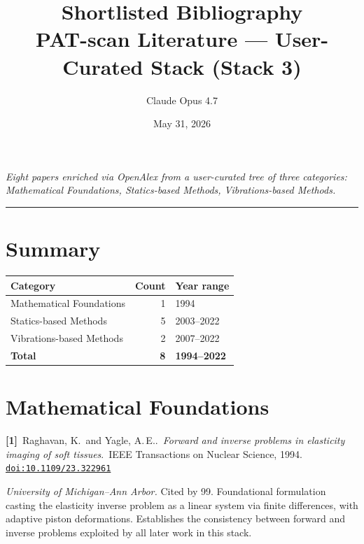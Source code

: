 \documentclass[11pt]{article}
\title{Shortlisted Bibliography \\[4pt]
  \large PAT-scan Literature --- User-Curated Stack (Stack 3)}
\author{Claude Opus 4.7}
\date{May 31, 2026}
\newcommand{\bibentry}[6]{%
  \noindent\textbf{[#1]}~#2.~\textit{#3}.~#4, #5.~%
  \href{https://doi.org/#6}{\texttt{doi:#6}}\par\vspace{6pt}
}
\begin{document}
\maketitle
\thispagestyle{fancy}

\begin{center}
\small\itshape
Eight papers enriched via OpenAlex from a user-curated tree of three categories: \\
Mathematical Foundations, Statics-based Methods, Vibrations-based Methods.
\end{center}

\vspace{1em}
\hrule
\vspace{1em}

\section*{Summary}

\begin{tabular}{@{}lrl@{}}
\textbf{Category} & \textbf{Count} & \textbf{Year range} \\
\hline
Mathematical Foundations & 1 & 1994 \\
Statics-based Methods    & 5 & 2003--2022 \\
Vibrations-based Methods & 2 & 2007--2022 \\
\hline
\textbf{Total}           & \textbf{8} & \textbf{1994--2022} \\
\end{tabular}

\vspace{1em}

\section{Mathematical Foundations}

\bibentry{1}{Raghavan, K.\ and Yagle, A.\,E.}{Forward and inverse problems in elasticity imaging of soft tissues}{IEEE Transactions on Nuclear Science}{1994}{10.1109/23.322961}

\textit{University of Michigan--Ann Arbor.} Cited by 99. \quad
Foundational formulation casting the elasticity inverse problem as a linear system via finite differences, with adaptive piston deformations. Establishes the consistency between forward and inverse problems exploited by all later work in this stack.
\end{document}
